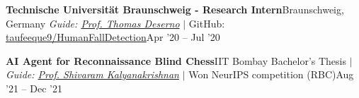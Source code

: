 {\entrybig
    {\textbf{Technische Universit\"at Braunschweig - Research Intern}}{Braunschweig, Germany}
    {\textit{Guide: \href{https://plri.de/en/team/thomas-deserno}{Prof. Thomas Deserno}} $|$ GitHub: \href{https://github.com/taufeeque9/HumanFallDetection}{taufeeque9/HumanFallDetection}}{Apr '20 -- Jul '20}

\entrybig
	{\textbf{AI Agent for Reconnaissance Blind Chess}}{IIT Bombay}
	{Bachelor's Thesis\textit{ $|$ Guide: \href{https://www.cse.iitb.ac.in/~shivaram/}{Prof. Shivaram Kalyanakrishnan}} $|$ Won NeurIPS competition (RBC)}{Aug '21 -- Dec '21}

}
